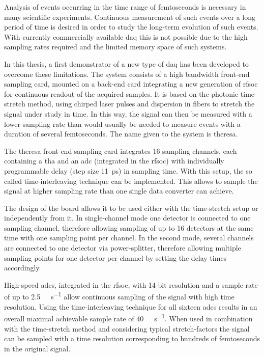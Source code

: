 
Analysis of events occurring in the time range of femtoseconds is necessary in many scientific experiments.
Continuous measurement of such events over a long period of time is desired in order to study the long-term evolution of such events.
With currently commercially available \gls{daq} this is not possible due to the high sampling rates required and the limited memory space of such systems. 

In this thesis, a first demonstrator of a new type of \gls{daq} has been developed to overcome these limitations.
The system consists of a high bandwidth front-end sampling card, mounted on a back-end card integrating a new generation of \gls{rfsoc} for continuous readout of the acquired samples. 
It is based on the photonic time-stretch method, using chirped laser pulses and dispersion in fibers to stretch the signal under study in time.
In this way, the signal can then be measured with a lower sampling rate than would usually be needed to measure events with a duration of several femtoseconds.
The name given to the system is \gls{theresa}.

The \gls{theresa} front-end sampling card integrates 16 sampling channels, each containing a \gls{tha} and an \gls{adc} (integrated in the \gls{rfsoc}) with individually programmable delay (step size \SI{11}{\pico \second}) in sampling time. 
With this setup, the so called time-interleaving technique can be implemented. 
This allows to sample the signal at higher sampling rate than one single data converter can achieve.

The design of the board allows it to be used either with the time-stretch setup or independently from it.
In single-channel mode one detector is connected to one sampling channel, therefore allowing sampling of up to 16 detectors at the same time with one sampling point per channel.
In the second mode, several channels are connected to one detector via power-splitter, therefore allowing multiple sampling points for one detector per channel by setting the delay times accordingly. 

High-speed \glspl{adc}, integrated in the \gls{rfsoc}, with 14-bit resolution and a sample rate of up to \SI{2.5}{\giga \sample\per\second} allow continuous sampling of the signal with high time resolution. 
Using the time-interleaving technique for all sixteen \glspl{adc} results in an overall maximal achievable sample rate of \SI{40}{\giga\sample\per\second}. 
When used in combination with the time-stretch method and considering typical stretch-factors the signal can be sampled with a time resolution corresponding to hundreds of femtoseconds in the original signal.

